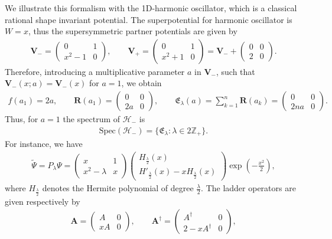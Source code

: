 \documentclass[pdftex]{sigma}%
\numberwithin{equation}{section}
\begin{document}
We illustrate this formalism with the 1D-harmonic oscillator, which is a classical rational shape invariant potential. The superpotential for harmonic oscillator is $W=x$, thus the supersymmetric partner potentials are given by
\begin{gather*}
\mathbf{V}_-=\begin{pmatrix}0&1\\x^2- 1&0\end{pmatrix}\!, \qquad \mathbf{V}_+=\begin{pmatrix}0&1\\x^2+1&0\end{pmatrix}=\mathbf{V}_-+\begin{pmatrix}0&0\\2&0\end{pmatrix}\!.
\end{gather*}
Therefore, introducing a multiplicative parameter $a$ in $\mathbf{V}_-$, such that $\mathbf{V}_-(x;a)=\mathbf{V}_-(x)$ for $a=1$, we obtain
\begin{gather*}
f(a_1)=2a,\qquad \mathbf{R}(a_1)=\begin{pmatrix}0&0\\2a&0\end{pmatrix}\!,\qquad \mathfrak{E}_{\lambda} (a) = \sum_{k=1}^n \mathbf{R}(a_k)=\begin{pmatrix}0&0\\2na&0\end{pmatrix}\!.
\end{gather*}
Thus, for $a=1$ the spectrum of $\mathcal H_-$ is
\begin{gather*}
\mathrm{Spec}(\mathcal H_-)=\{\mathfrak E_\lambda\colon\lambda\in 2\mathbb{Z}_+\}.
\end{gather*}
For instance, we have
\begin{gather*}
\widetilde{\Psi}=P_\lambda\Psi=\begin{pmatrix}
x&1\\x^2-\lambda&x\end{pmatrix}\begin{pmatrix}
H_{\frac{\lambda}{2}}(x)\\H'_{\frac{\lambda}{2}}(x)-xH_{\frac{\lambda}{2}}(x)
\end{pmatrix}\exp\left({-}\frac{x^2}{2}\right),
\end{gather*}
where $H_{\frac{\lambda}{2}}$ denotes the Hermite polynomial of degree $\frac{\lambda}{2}$. The ladder operators are given respectively by
\begin{gather*}
\mathbf{A}=\begin{pmatrix}
A&0\\xA&0\end{pmatrix}\!,\qquad \mathbf{A}^\dag=\begin{pmatrix}
A^\dag&0\\2-xA^\dag&0\end{pmatrix}\!,
\end{gather*}
\end{document}
